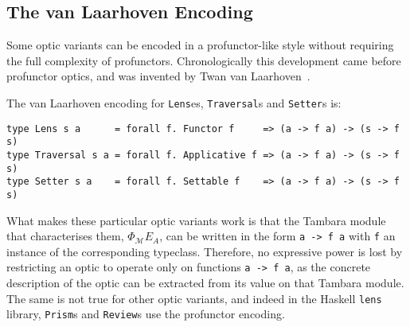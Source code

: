 \documentclass[11pt,letterpaper]{article}
\makeatletter
\theoremstyle{plain}
\newtheorem{theorem}{Theorem}[subsection]
\theoremstyle{definition}
\newcommand{\C}{\mathscr{C}}
\newcommand{\M}{\mathscr{M}}
\newcommand{\lenslib}{\texttt{lens}}
\newcommand{\Pastro}{\Phi}
\newcommand{\id}{\mathrm{id}}
\newcommand{\hto}{\ensuremath{\,\mathaccent\shortmid\rightarrow\,}}
\providecommand{\leftsquigarrow}{%
  \mathrel{\mathpalette\reflect@squig\relax}%
}
\newcommand{\reflect@squig}[2]{%
  \reflectbox{$\m@th#1\rightsquigarrow$}%
}
\newcommand{\todo}[1]{\textcolor{red}{\small #1}}
\makeatother
\begin{document}
%
%
%

\subsection{The van Laarhoven Encoding}

Some optic variants can be encoded in a profunctor-like style without requiring the full complexity of profunctors. Chronologically this development came before profunctor optics, and was invented by Twan van Laarhoven~\cite{VanLaarhovenPost}.

The van Laarhoven encoding for \texttt{Lens}es, \texttt{Traversal}s and \texttt{Setter}s is:
\begin{verbatim}
type Lens s a      = forall f. Functor f     => (a -> f a) -> (s -> f s)
type Traversal s a = forall f. Applicative f => (a -> f a) -> (s -> f s)
type Setter s a    = forall f. Settable f    => (a -> f a) -> (s -> f s)
\end{verbatim}
What makes these particular optic variants work is that the Tambara module that characterises them, $\Pastro_\M E_A$, can be written in the form \texttt{a -> f a} with \texttt{f} an instance of the corresponding typeclass. Therefore, no expressive power is lost by restricting an optic to operate only on functions \texttt{a -> f a}, as the concrete description of the optic can be extracted from its value on that Tambara module. The same is not true for other optic variants, and indeed in the Haskell \lenslib{} library, \texttt{Prism}s and \texttt{Review}s use the profunctor encoding.
\end{document}

